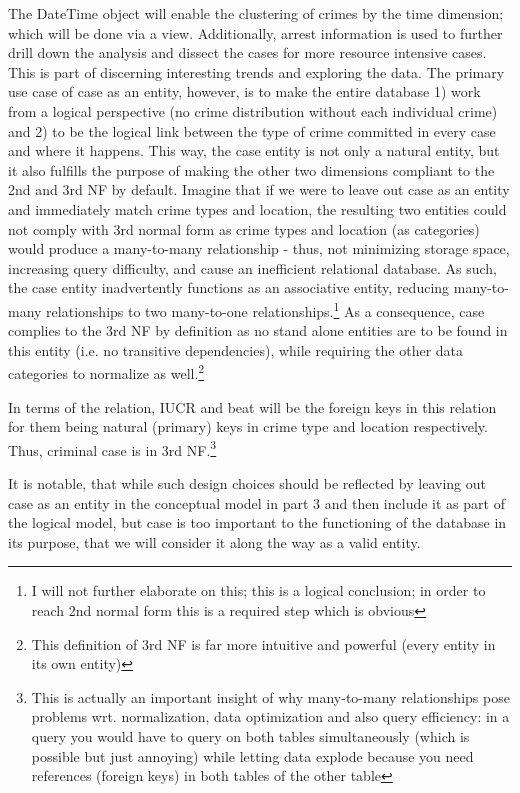 \documentclass[a4paper]{article}
\begin{document}
The DateTime object will enable the clustering of crimes by the time dimension; which will be done via a view. Additionally, arrest information is used to further drill down the analysis and dissect the cases for more resource intensive cases. This is part of discerning interesting trends and exploring the data. The primary use case of case as an entity, however, is to make the entire database 1) work from a logical perspective (no crime distribution without each individual crime) and 2) to be the logical link between the type of crime committed in every case and where it happens. This way, the case entity is not only a natural entity, but it also fulfills the purpose of making the other two dimensions compliant to the 2nd and 3rd NF by default. Imagine that if we were to leave out case as an entity and immediately match crime types and location, the resulting two entities could not comply with 3rd normal form as crime types and location (as categories) would produce a many-to-many relationship - thus, not minimizing storage space, increasing query difficulty, and cause an inefficient relational database. As such, the case entity inadvertently functions as an associative entity, reducing many-to-many relationships to two many-to-one relationships.\footnote{I will not further elaborate on this; this is a logical conclusion; in order to reach 2nd normal form this is a required step which is obvious} As a consequence, case complies to the 3rd NF by definition as no stand alone entities are to be found in this entity (i.e. no transitive dependencies), while requiring the other data categories to normalize as well.\footnote{This definition of 3rd NF is far more intuitive and powerful (every entity in its own entity)}

In terms of the relation, IUCR and beat will be the foreign keys in this relation for them being natural (primary) keys in crime type and location respectively. Thus, criminal case is in 3rd NF.\footnote{This is actually an important insight of why many-to-many relationships pose problems wrt. normalization, data optimization and also query efficiency: in a query you would have to query on both tables simultaneously (which is possible but just annoying) while letting data explode because you need references (foreign keys) in both tables of the other table}

It is notable, that while such design choices should be reflected by leaving out case as an entity in the conceptual model in part 3 and then include it as part of the logical model, but case is too important to the functioning of the database in its purpose, that we will consider it along the way as a valid entity.
 
\end{document}
